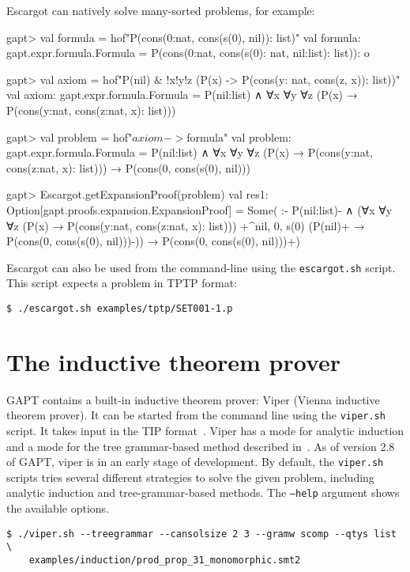 \documentclass[a4paper,11pt]{book}
\newcommand{\cli}[1]{{\ttfamily {#1}}}
\begin{document}
Escargot can natively solve many-sorted problems, for example:
\begin{clilisting}
  gapt> val formula = hof"P(cons(0:nat, cons(s(0), nil)): list)"
  val formula: gapt.expr.formula.Formula = P(cons(0:nat, cons(s(0): nat, nil:list): list)): o

  gapt> val axiom = hof"P(nil) & !x!y!z (P(x) -> P(cons(y: nat, cons(z, x)): list))"
  val axiom: gapt.expr.formula.Formula = P(nil:list) ∧ ∀x ∀y ∀z (P(x) → P(cons(y:nat, cons(z:nat, x): list)))

  gapt> val problem = hof"$axiom -> $formula"
  val problem: gapt.expr.formula.Formula = P(nil:list) ∧ ∀x ∀y ∀z (P(x) → P(cons(y:nat, cons(z:nat, x): list))) →
  P(cons(0, cons(s(0), nil)))

  gapt> Escargot.getExpansionProof(problem)
  val res1: Option[gapt.proofs.expansion.ExpansionProof] = Some(
  :-
  P(nil:list)- ∧
  (∀x ∀y ∀z (P(x) → P(cons(y:nat, cons(z:nat, x): list)))
  +^{nil, 0, s(0)} (P(nil)+ → P(cons(0, cons(s(0), nil)))-)) →
  P(cons(0, cons(s(0), nil)))+)

\end{clilisting}


Escargot can also be used from the command-line using the \texttt{escargot.sh}
script.  This script expects a problem in TPTP format:
\begin{lstlisting}
$ ./escargot.sh examples/tptp/SET001-1.p
\end{lstlisting}

\section{The inductive theorem prover \cli{viper}}

GAPT contains a built-in inductive theorem prover: Viper (Vienna inductive theorem prover). It
can be started from the command line using the \texttt{viper.sh} script. It takes input in the
TIP format~\cite{Claessen15TIP}. Viper has a mode for analytic induction and a mode for
the tree grammar-based method described in~\cite{Eberhard15Inductive}. As of version 2.8 of GAPT,
viper is in an early stage of development.  By default, the \texttt{viper.sh}
scripts tries several different strategies to solve the given problem,
including analytic induction and tree-grammar-based methods.  The
\texttt{--help} argument shows the available options.
\begin{lstlisting}
$ ./viper.sh --treegrammar --cansolsize 2 3 --gramw scomp --qtys list \
    examples/induction/prod_prop_31_monomorphic.smt2
\end{lstlisting}
\end{document}
